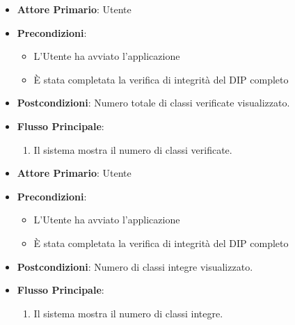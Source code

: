 \begin{itemize}
    \item \textbf{Attore Primario}: Utente
    \item \textbf{Precondizioni}: 
        \begin{itemize}
            \item L'Utente ha avviato l'applicazione
            \item È stata completata la verifica di integrità del DIP completo
        \end{itemize} 
    \item \textbf{Postcondizioni}: Numero totale di classi verificate visualizzato.     
    \item \textbf{Flusso Principale}:
        \begin{enumerate}
            \item Il sistema mostra il numero di classi verificate.
        \end{enumerate}
\end{itemize}

\begin{itemize}
    \item \textbf{Attore Primario}: Utente
    \item \textbf{Precondizioni}: 
        \begin{itemize}
            \item L'Utente ha avviato l'applicazione
            \item È stata completata la verifica di integrità del DIP completo
        \end{itemize} 
    \item \textbf{Postcondizioni}: Numero di classi integre visualizzato.     
    \item \textbf{Flusso Principale}:
        \begin{enumerate}
            \item Il sistema mostra il numero di classi integre.
        \end{enumerate}
\end{itemize}

